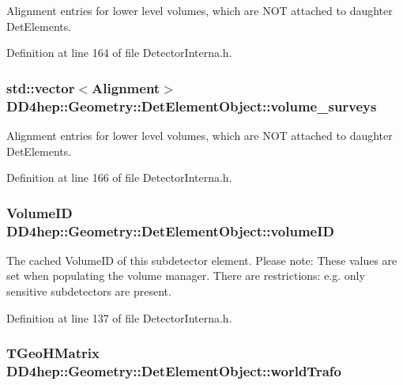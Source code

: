 Alignment entries for lower level volumes, which are NOT attached to daughter DetElements. 

Definition at line 164 of file DetectorInterna.h.\hypertarget{class_d_d4hep_1_1_geometry_1_1_det_element_object_a7fdbe44b6eee280dc2197b7627c2012e}{
\subsubsection[{volume\_\-surveys}]{\setlength{\rightskip}{0pt plus 5cm}std::vector$<${\bf Alignment}$>$ {\bf DD4hep::Geometry::DetElementObject::volume\_\-surveys}}}
\label{class_d_d4hep_1_1_geometry_1_1_det_element_object_a7fdbe44b6eee280dc2197b7627c2012e}


Alignment entries for lower level volumes, which are NOT attached to daughter DetElements. 

Definition at line 166 of file DetectorInterna.h.\hypertarget{class_d_d4hep_1_1_geometry_1_1_det_element_object_a276f203e5b02da612f42450767bf9756}{
\subsubsection[{volumeID}]{\setlength{\rightskip}{0pt plus 5cm}VolumeID {\bf DD4hep::Geometry::DetElementObject::volumeID}}}
\label{class_d_d4hep_1_1_geometry_1_1_det_element_object_a276f203e5b02da612f42450767bf9756}


The cached VolumeID of this subdetector element. Please note: These values are set when populating the volume manager. There are restrictions: e.g. only sensitive subdetectors are present. 

Definition at line 137 of file DetectorInterna.h.\hypertarget{class_d_d4hep_1_1_geometry_1_1_det_element_object_ae6ff583186272de915842f8fb9603590}{
\subsubsection[{worldTrafo}]{\setlength{\rightskip}{0pt plus 5cm}TGeoHMatrix {\bf DD4hep::Geometry::DetElementObject::worldTrafo}}}
\label{class_d_d4hep_1_1_geometry_1_1_det_element_object_ae6ff583186272de915842f8fb9603590}


